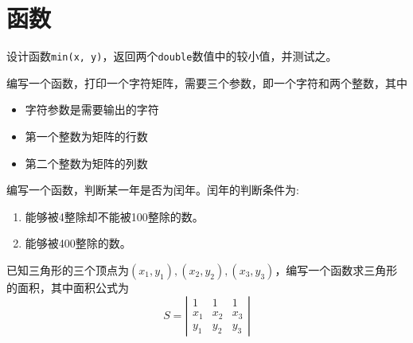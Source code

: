 \section{函数}

\begin{frame}
  \begin{biancheng}
    设计函数\lstinline|min(x, y)|，返回两个\lstinline|double|数值中的较小值，并测试之。
  \end{biancheng}
\end{frame}

\begin{frame}
  \begin{biancheng}
    编写一个函数，打印一个字符矩阵，需要三个参数，即一个字符和两个整数，其中
    \begin{itemize}
    \item 字符参数是需要输出的字符
    \item 第一个整数为矩阵的行数
    \item 第二个整数为矩阵的列数
    \end{itemize}
  \end{biancheng}
\end{frame}

\begin{frame}
  \begin{biancheng}
    编写一个函数，判断某一年是否为闰年。闰年的判断条件为:
    \begin{enumerate}
    \item 能够被4整除却不能被100整除的数。
    \item 能够被400整除的数。
    \end{enumerate}
  \end{biancheng}
\end{frame}

\begin{frame}
  \begin{biancheng}
    已知三角形的三个顶点为$(x_1,y_1), (x_2, y_2), (x_3, y_3)$，编写一个函数求三角形的面积，其中面积公式为
    $$
    S = \left|
      \begin{array}{ccc}
        1&1&1\\
        x_1&x_2&x_3\\
        y_1&y_2&y_3
      \end{array}
    \right|
    $$
  \end{biancheng}
\end{frame}

